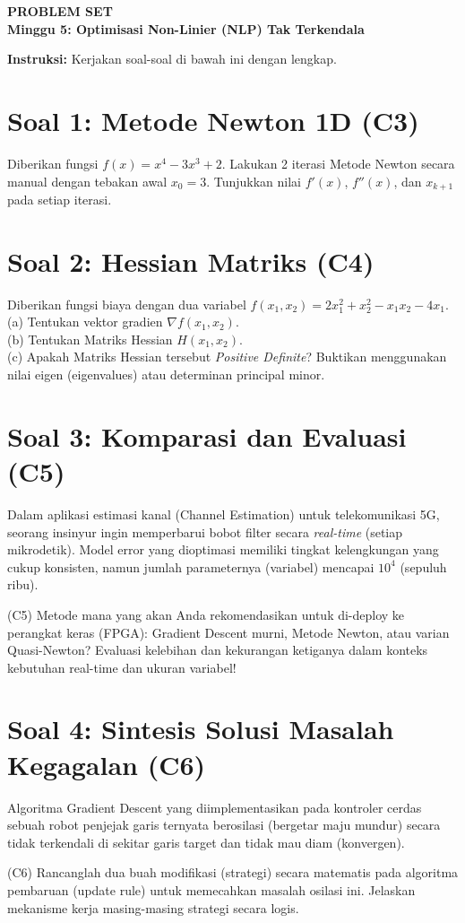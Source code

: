 \documentclass[11pt, a4paper]{article}
\begin{document}
\begin{center}
    \Large\color{UNIBBlue}\textbf{PROBLEM SET}\\
    \large\textbf{Minggu 5: Optimisasi Non-Linier (NLP) Tak Terkendala}
\end{center}

\vspace{0.5cm}

\textbf{Instruksi:} Kerjakan soal-soal di bawah ini dengan lengkap.

\section*{Soal 1: Metode Newton 1D (C3)}
Diberikan fungsi $f(x) = x^4 - 3x^3 + 2$.
Lakukan 2 iterasi Metode Newton secara manual dengan tebakan awal $x_0 = 3$. 
Tunjukkan nilai $f'(x)$, $f''(x)$, dan $x_{k+1}$ pada setiap iterasi.

\section*{Soal 2: Hessian Matriks (C4)}
Diberikan fungsi biaya dengan dua variabel $f(x_1, x_2) = 2x_1^2 + x_2^2 - x_1 x_2 - 4x_1$. \\
(a) Tentukan vektor gradien $\nabla f(x_1, x_2)$. \\
(b) Tentukan Matriks Hessian $H(x_1, x_2)$. \\
(c) Apakah Matriks Hessian tersebut \textit{Positive Definite}? Buktikan menggunakan nilai eigen (eigenvalues) atau determinan principal minor.

\section*{Soal 3: Komparasi dan Evaluasi (C5)}
Dalam aplikasi estimasi kanal (Channel Estimation) untuk telekomunikasi 5G, seorang insinyur ingin memperbarui bobot filter secara \textit{real-time} (setiap mikrodetik). Model error yang dioptimasi memiliki tingkat kelengkungan yang cukup konsisten, namun jumlah parameternya (variabel) mencapai $10^4$ (sepuluh ribu).

(C5) Metode mana yang akan Anda rekomendasikan untuk di-deploy ke perangkat keras (FPGA): Gradient Descent murni, Metode Newton, atau varian Quasi-Newton? Evaluasi kelebihan dan kekurangan ketiganya dalam konteks kebutuhan real-time dan ukuran variabel!

\section*{Soal 4: Sintesis Solusi Masalah Kegagalan (C6)}
Algoritma Gradient Descent yang diimplementasikan pada kontroler cerdas sebuah robot penjejak garis ternyata berosilasi (bergetar maju mundur) secara tidak terkendali di sekitar garis target dan tidak mau diam (konvergen).

(C6) Rancanglah dua buah modifikasi (strategi) secara matematis pada algoritma pembaruan (update rule) untuk memecahkan masalah osilasi ini. Jelaskan mekanisme kerja masing-masing strategi secara logis.
\end{document}
